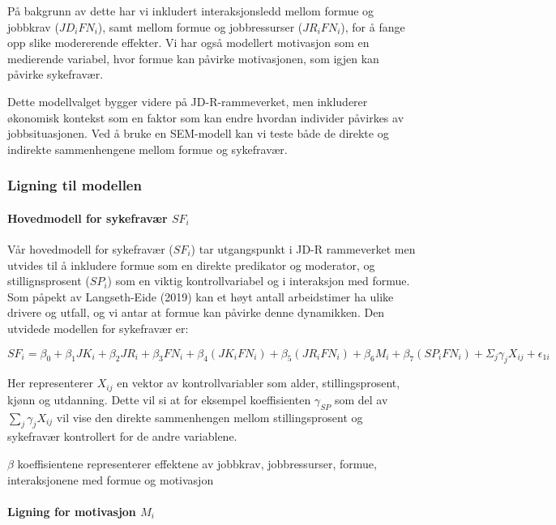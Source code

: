 \documentclass[
  12pt,
  a4paper,
  DIV=11,
  numbers=noendperiod]{scrartcl}
\let\oldparagraph\paragraph
\renewcommand{\paragraph}[1]{\oldparagraph{#1}\mbox{}}
\begin{document}
På bakgrunn av dette har vi inkludert interaksjonsledd mellom formue og
jobbkrav (\(JD_i FN_i\)), samt mellom formue og jobbressurser
(\(JR_i FN_i\)), for å fange opp slike modererende effekter. Vi har også
modellert motivasjon som en medierende variabel, hvor formue kan påvirke
motivasjonen, som igjen kan påvirke sykefravær.

Dette modellvalget bygger videre på JD-R-rammeverket, men inkluderer
økonomisk kontekst som en faktor som kan endre hvordan individer
påvirkes av jobbsituasjonen. Ved å bruke en SEM-modell kan vi teste både
de direkte og indirekte sammenhengene mellom formue og sykefravær.

\subsubsection{Ligning til modellen}\label{ligning-til-modellen}

\paragraph{\texorpdfstring{Hovedmodell for sykefravær
\(SF_i\)}{Hovedmodell for sykefravær SF\_i}}\label{hovedmodell-for-sykefravuxe6r-sf_i}

Vår hovedmodell for sykefravær (\(SF_i\)) tar utgangspunkt i JD-R
rammeverket men utvides til å inkludere formue som en direkte predikator
og moderator, og stillignsprosent (\(SP_i\)) som en viktig
kontrollvariabel og i interaksjon med formue. Som påpekt av
Langseth-Eide (2019) kan et høyt antall arbeidstimer ha ulike drivere og
utfall, og vi antar at formue kan påvirke denne dynamikken. Den utvidede
modellen for sykefravær er:

\[
SF_i = \beta_0 + \beta_1 JK_i + \beta_2 JR_i + \beta_3 FN_i + \beta_4 (JK_i FN_i) + \beta_5 (JR_i FN_i) + \beta_6 M_i + \beta_7 (SP_i FN_i) + \Sigma_j \gamma_{j}X_{ij} + \epsilon_{1i} \label{eq:sf_utvidet}
\]

Her representerer \(X_{ij}\) en vektor av kontrollvariabler som alder,
stillingsprosent, kjønn og utdanning. Dette vil si at for eksempel
koeffisienten \(\gamma_{SP}\) som del av \(\sum_j \gamma_{j}X_{ij}\) vil
vise den direkte sammenhengen mellom stillingsprosent og sykefravær
kontrollert for de andre variablene.

\(\beta\) koeffisientene representerer effektene av jobbkrav,
jobbressurser, formue, interaksjonene med formue og motivasjon

\paragraph{\texorpdfstring{Ligning for motivasjon
\(M_i\)}{Ligning for motivasjon M\_i}}\label{ligning-for-motivasjon-m_i}
\end{document}
